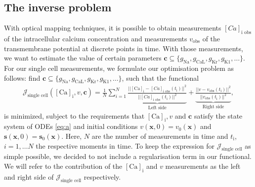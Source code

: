 \documentclass{article}
\begin{document}
\subsection{The inverse problem} \label{The inverse problem}
With optical mapping techniques, it is possible to obtain measurements $[Ca]_{\text{i obs}}$ of the intracellular calcium concentration and measurements $v_{\text{obs}}$ of the transmembrane potential at discrete points in time. With those measurements, we want to estimate the value of certain parameters $\boldsymbol{c}\subseteq \{g_{\mathrm{Na}}, g_{\mathrm{CaL}}, g_{\mathrm{Kr}}, g_{\mathrm{K1}}, \ldots \}$. For our single cell measurements, we formulate our optimisation problem as follows: find $\boldsymbol{c} \subseteq\{ g_{\mathrm{Na}}, g_{\mathrm{CaL}}, g_{\mathrm{Kr}}, g_{\mathrm{K1}}, \ldots \}$, such that the functional
\begin{eqnarray}
\mathcal{J}_{\text{single cell}}([\mathrm{Ca}]_{\mathrm{i}},v, \boldsymbol{c}) = \frac{1}{N} \sum_{i=1}^{N} \underbrace{\frac{||[\mathrm{Ca}]_{\mathrm{i}}-[Ca]_{\text{i obs}}(t_{\mathrm{i}}) ||^2}{||[Ca]_{\text{i obs}}(t_{\mathrm{i}}) ||^2}}_{\text{Left side}} + \underbrace{\frac{||v-v_{\text{obs}}(t_{\mathrm{i}})||^2}{||v_{\text{obs}}(t_{\mathrm{i}})||^2}}_{\text{Right side}}, \label{J_s}
\end{eqnarray}
is minimized, subject to the requirements that $[\mathrm{Ca}]_{\mathrm{i}}, v$ and $\boldsymbol{c}$ satisfy the state system of ODEs \eqref{eq:a} and initial conditions $v(\textbf{x},0)=v_0(\textbf{x})$ and $\mathbf{s}(\mathbf{x},0)=\mathbf{s}_0(\mathbf{x})$. Here, $N$ are the number of measurements in time and $t_{\mathrm{i}}$, $i=1, \dots N$ the respective moments in time. To keep the expression for $\mathcal{J}_{\text{single cell}}$ as simple possible, we decided to not include a regularisation term in our functional. We will refer to the contribution of the $[\mathrm{Ca}]_{\mathrm{i}}$ and $v$ measurements as the left and right side of $\mathcal{J}_{\text{single cell}}$ respectively.
\end{document}
